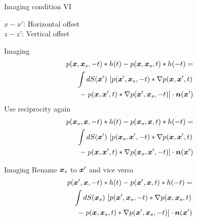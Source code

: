 \documentclass[xcolor=dvipsnames,notes]{beamer}
\begin{document}
\begin{frame}{Imaging condition VI}
\begin{figure}
\end{figure}

$x-x'$: Horizontal offset \\
$z-z'$: Vertical offset 
\end{frame}
\begin{frame}{Imaging}
\begin{eqnarray}
 p(\xx,\xx_s,-t)*h(t)-p(\xx,\xx_s,t)*h(-t) =\nonumber\\
\int dS(\xx')\, \left[p(\xx',\xx_s,-t)*\nabla p(\xx,\xx',t)\right.\nonumber\\
   -\left. p(\xx,\xx',t)*\nabla p(\xx',\xx_s,-t)\right]\cdot \nn(\xx')
&&                   \label{eq:9000}
\end{eqnarray}
Use reciprocity again
\begin{eqnarray}
 p(\xx_s,\xx,-t)*h(t)-p(\xx_s,\xx,t)*h(-t) =\nonumber\\
\int dS(\xx')\, \left[p(\xx_s,\xx',-t)*\nabla p(\xx,\xx',t)\right.\nonumber\\
   -\left. p(\xx,\xx',t)*\nabla p(\xx_s,\xx',-t)\right]\cdot \nn(\xx')
&&                   \label{eq:9100}
\end{eqnarray}
\end{frame}
\begin{frame}{Imaging}
Rename $\xx_s$ to $\xx'$ and vice versa
\begin{eqnarray}
 p(\xx',\xx,-t)*h(t)-p(\xx',\xx,t)*h(-t) =\nonumber\\
\int dS(\xx_s)\, \left[p(\xx',\xx_s,-t)*\nabla p(\xx,\xx_s,t)\right.\nonumber\\
   -\left. p(\xx,\xx_s,t)*\nabla p(\xx',\xx_s,-t)\right]\cdot \nn(\xx')
&&                   \label{eq:9200}
\end{eqnarray}
\end{frame}
\end{document}

